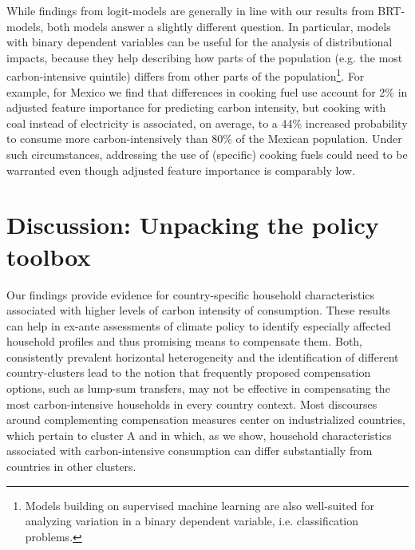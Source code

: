 \documentclass[12pt, a4paper]{article}
\begin{document}
While findings from logit-models are generally in line with our results from BRT-models, both models answer a slightly different question. In particular, models with binary dependent variables can be useful for the analysis of distributional impacts, because they help describing how parts of the population (e.g. the most carbon-intensive quintile) differs from other parts of the population\footnote{Models building on supervised machine learning are also well-suited for analyzing variation in a binary dependent variable, i.e. classification problems.}. For example, for Mexico we find that differences in cooking fuel use account for 2\% in adjusted feature importance for predicting carbon intensity, but cooking with coal instead of electricity is associated, on average, to a 44\% increased probability to consume more carbon-intensively than 80\% of the Mexican population. Under such circumstances, addressing the use of (specific) cooking fuels could need to be warranted even though adjusted feature importance is comparably low.

\section{Discussion: Unpacking the policy toolbox} \label{sec:discussion}

Our findings provide evidence for country-specific household characteristics associated with higher levels of carbon intensity of consumption. These results can help in ex-ante assessments of climate policy to identify especially affected household profiles and thus promising means to compensate them. Both, consistently prevalent horizontal heterogeneity and the identification of different country-clusters lead to the notion that frequently proposed compensation options, such as lump-sum transfers, may not be effective in compensating the most carbon-intensive households in every country context. Most discourses around complementing compensation measures center on industrialized countries, which pertain to cluster A and in which, as we show, household characteristics associated with carbon-intensive consumption can differ substantially from countries in other clusters.
\end{document}
